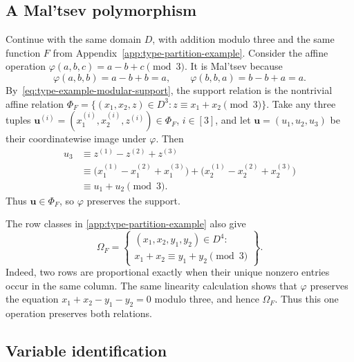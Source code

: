 \documentclass[11pt,letterpaper,onecolumn]{article}
\theoremstyle{plain}
\theoremstyle{definition}
\theoremstyle{remark}
\newcommand{\SuppRel}[1]{\Phi_{#1}}
\newcommand{\RowEq}[1]{\Omega_{#1}}
\begin{document}
\subsection{A Mal'tsev polymorphism}
\label{app:maltsev-example}

Continue with the same domain $D$, with addition modulo three and the same function $F$
from Appendix~\ref{app:type-partition-example}.  Consider the affine operation $\varphi(a,b,c)=a-b+c\pmod3$. It is Mal'tsev because
\[
  \varphi(a,b,b)=a-b+b=a,
  \qquad
  \varphi(b,b,a)=b-b+a=a.
\]
By~\eqref{eq:type-example-modular-support}, the support relation is the
nontrivial affine relation $\SuppRel F =\{(x_1,x_2,z)\in D^3:z\equiv x_1+x_2\pmod3\}$. Take any three tuples
$\mathbf u^{(i)}=(x_1^{(i)},x_2^{(i)},z^{(i)})\in\SuppRel F$,
$i\in[3]$, and let
$\mathbf u=(u_1,u_2,u_3)$ be their coordinatewise image under $\varphi$.  Then
\[
\begin{aligned}
  u_3
  &\equiv z^{(1)}-z^{(2)}+z^{(3)}\\
  &\equiv
    \bigl(x_1^{(1)}-x_1^{(2)}+x_1^{(3)}\bigr)
    +\bigl(x_2^{(1)}-x_2^{(2)}+x_2^{(3)}\bigr)\\
  &\equiv u_1+u_2\pmod3.
\end{aligned}
\]
Thus $\mathbf u\in\SuppRel F$, so $\varphi$ preserves the support.

The row classes in \cref{app:type-partition-example} also give
\[
  \RowEq F
  =
  \left\{
  \begin{array}{l}
    (x_1,x_2,y_1,y_2)\in D^4:\\
    x_1+x_2\equiv y_1+y_2\pmod3
  \end{array}
  \right\}.
\]
Indeed, two rows are proportional exactly when their unique nonzero entries
occur in the same column.  The same linearity calculation shows that
$\varphi$ preserves the equation $x_1+x_2-y_1-y_2=0$ modulo three, and hence
$\RowEq F$.  Thus this one operation preserves both relations.

\subsection{Variable identification}
\label{app:variable-identification-example}
\end{document}
